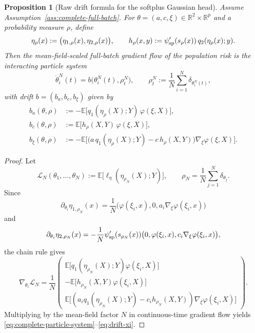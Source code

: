 \documentclass[11pt]{article}
\newtheorem{proposition}[theorem]{Proposition}
\theoremstyle{definition}
\newcommand{\R}{\mathbb{R}}
\newcommand{\E}{\mathbb{E}}
\newcommand{\mc}[1]{\mathcal{#1}}
\begin{document}
\begin{proposition}[Raw drift formula for the softplus Gaussian head]
\label{prop:softplus-raw-drift}
Assume Assumption~\ref{ass:complete-full-batch}. For
$\theta=(a,c,\xi)\in\R^2\times\R^p$ and a probability measure $\rho$, define
\[
  \eta_\rho(x)
  :=
  \bigl(\eta_{1,\rho}(x),\eta_{2,\rho}(x)\bigr),
  \qquad
  h_\rho(x,y)
  :=
  \psi_{\rm sp}'(s_\rho(x))\,q_2(\eta_\rho(x);y).
\]
Then the mean-field-scaled full-batch gradient flow of the population risk is
the interacting particle system
\begin{equation}
  \dot\theta_i^N(t)
  =
  b\bigl(\theta_i^N(t),\rho_t^N\bigr),
  \qquad
  \rho_t^N:=\frac1N\sum_{i=1}^N \delta_{\theta_i^N(t)},
  \label{eq:complete-particle-system}
\end{equation}
with drift $b=(b_a,b_c,b_\xi)$ given by
\begin{align}
  b_a(\theta,\rho)
  &:=
  -
  \E\big[q_1(\eta_\rho(X);Y)\,\varphi(\xi,X)\big],
  \label{eq:drift-a}
  \\
  b_c(\theta,\rho)
  &:=
  \E\big[h_\rho(X,Y)\,\varphi(\xi,X)\big],
  \label{eq:drift-c}
  \\
  b_\xi(\theta,\rho)
  &:=
  -
  \E\Big[
    \big(a\,q_1(\eta_\rho(X);Y)-c\,h_\rho(X,Y)\big)\nabla_\xi\varphi(\xi,X)
  \Big].
  \label{eq:drift-xi}
\end{align}
\end{proposition}

\begin{proof}
Let
\[
  \mc{L}_N(\theta_1,\dots,\theta_N)
  :=
  \E\big[\ell_\eta(\eta_{\rho_N}(X);Y)\big],
  \qquad
  \rho_N=\frac1N\sum_{j=1}^N\delta_{\theta_j}.
\]
Since
\[
  \partial_{\theta_i}\eta_{1,\rho_N}(x)
  =
  \frac1N\bigl(\varphi(\xi_i,x),0,a_i\nabla_\xi\varphi(\xi_i,x)\bigr)
\]
and
\[
  \partial_{\theta_i}\eta_{2,\rho_N}(x)
  =
  -\frac1N\psi_{\rm sp}'(s_{\rho_N}(x))
  \bigl(0,\varphi(\xi_i,x),c_i\nabla_\xi\varphi(\xi_i,x)\bigr),
\]
the chain rule gives
\[
  \nabla_{\theta_i}\mc{L}_N
  =
  \frac1N
  \begin{pmatrix}
    \E\big[q_1(\eta_{\rho_N}(X);Y)\varphi(\xi_i,X)\big]
    \\
    -\E\big[h_{\rho_N}(X,Y)\varphi(\xi_i,X)\big]
    \\
    \E\big[(a_i q_1(\eta_{\rho_N}(X);Y)-c_i h_{\rho_N}(X,Y))
    \nabla_\xi\varphi(\xi_i,X)\big]
  \end{pmatrix}.
\]
Multiplying by the mean-field factor $N$ in continuous-time gradient flow
yields \eqref{eq:complete-particle-system}--\eqref{eq:drift-xi}.
\end{proof}
\end{document}

